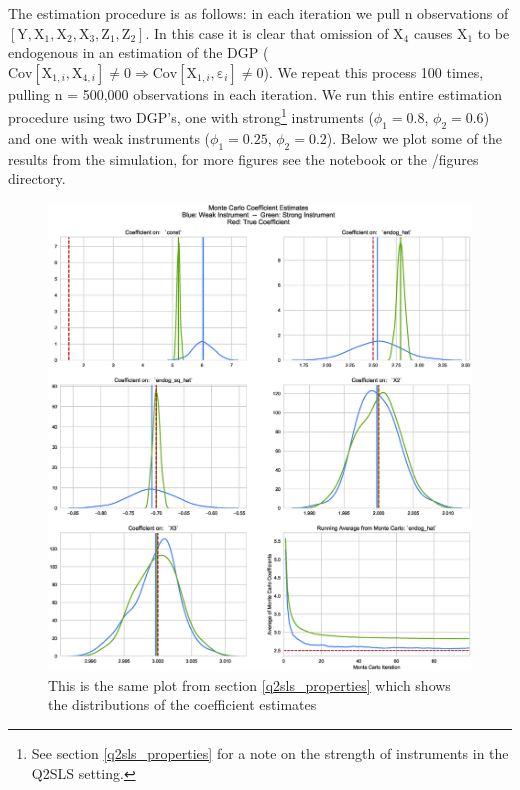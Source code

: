 \documentclass[12pt]{article}
\newcommand{\Cov}{\mathrm{Cov}}
\begin{document}
The estimation procedure is as follows: in each iteration we pull n observations of $[\mathrm{Y}, \mathrm{X}_1, \mathrm{X}_2, \mathrm{X}_3, \mathrm{Z}_1, \mathrm{Z}_2]$. In this case it is clear that omission of $\mathrm{X}_4$ causes $\mathrm{X}_1$ to be endogenous in an estimation of the DGP ($\Cov[\mathrm{X}_{1, i}, \mathrm{X}_{4, i}] \ne 0 \Rightarrow \mathrm{Cov}[\mathrm{X}_{1, i}, \mathrm{\varepsilon}_{i}]  \ne 0 $). We repeat this process 100 times, pulling n = 500,000 observations in each iteration. We run this entire estimation procedure using two DGP's, one with strong\footnote{See section \ref{q2sls_properties} for a note on the strength of instruments in the Q2SLS setting.} instruments ($\phi_1 = 0.8$, $\phi_2 = 0.6$) and one with weak instruments ($\phi_1 = 0.25$, $\phi_2 = 0.2$). Below we plot some of the results from the simulation, for more figures see the notebook or the /figures directory.

\begin{figure}[H]
\centering
\includegraphics[width=1\linewidth,keepaspectratio]{figures/MC_strong_and_weak.eps}
\caption{This is the same plot from section \ref{q2sls_properties} which shows the distributions of the coefficient estimates}
\end{figure}
\end{document}
